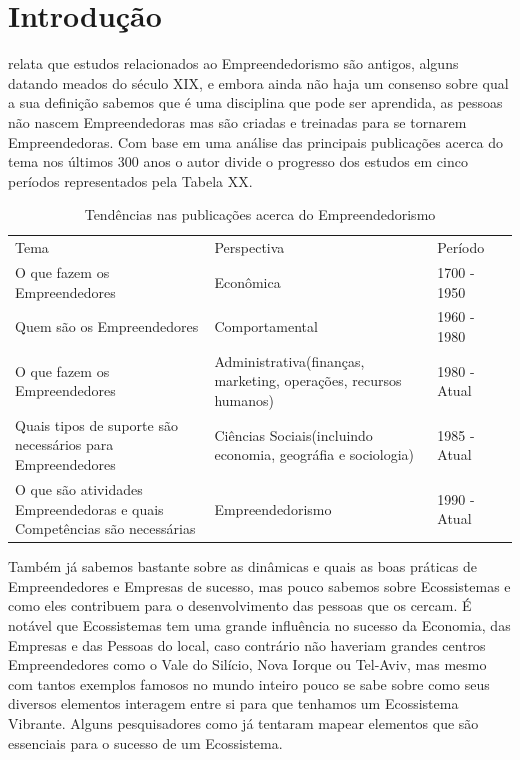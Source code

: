 \chapter{Introdução}
\label{cap-introducao}

 relata que estudos relacionados ao Empreendedorismo são antigos, alguns datando meados do século XIX, e embora ainda não haja um consenso sobre qual a sua definição sabemos que é uma disciplina que pode ser aprendida, as pessoas não nascem Empreendedoras mas são criadas e treinadas para se tornarem Empreendedoras. Com base em uma análise das principais publicações acerca do tema nos últimos 300 anos o autor divide o progresso dos estudos em cinco períodos representados pela Tabela XX.

\begin{table}[!htb]
\centering
\caption{Tendências nas publicações acerca do Empreendedorismo}
\label{tabela:tendencias_nas_publicacoes_acerca_do_empreendedorismo}
\begin{tabular}{llll}
Tema & Perspectiva & Período \\
O que fazem os Empreendedores & Econômica & 1700 - 1950 \\
Quem são os Empreendedores & Comportamental & 1960 - 1980 \\
O que fazem os Empreendedores & Administrativa(finanças, marketing, operações, recursos humanos) & 1980 - Atual \\
Quais tipos de suporte são necessários para Empreendedores & Ciências Sociais(incluindo economia, geográfia e sociologia) & 1985 - Atual \\
O que são atividades Empreendedoras e quais Competências são necessárias & Empreendedorismo & 1990 - Atual \\
\end{tabular}
\end{table}

Também já sabemos bastante sobre as dinâmicas e quais as boas práticas de Empreendedores e Empresas de sucesso, mas pouco sabemos sobre Ecossistemas e como eles contribuem para o desenvolvimento das pessoas que os cercam. É notável que Ecossistemas tem uma grande influência no sucesso da Economia, das Empresas e das Pessoas do local, caso contrário não haveriam grandes centros Empreendedores como o Vale do Silício, Nova Iorque ou Tel-Aviv, mas mesmo com tantos exemplos famosos no mundo inteiro pouco se sabe sobre como seus diversos elementos interagem entre si para que tenhamos um Ecossistema Vibrante. Alguns pesquisadores como  já tentaram mapear elementos que são essenciais para o sucesso de um Ecossistema.

